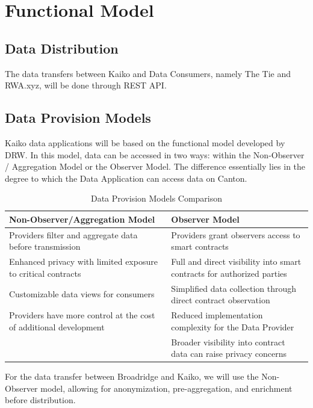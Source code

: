 \documentclass[11pt,a4paper]{article}
\begin{document}
\section{Functional Model}

\subsection{Data Distribution}

The data transfers between Kaiko and Data Consumers, namely The Tie and RWA.xyz, will be done through REST API.

\subsection{Data Provision Models}

Kaiko data applications will be based on the functional model developed by DRW. In this model, data can be accessed in two ways: within the Non-Observer / Aggregation Model or the Observer Model. The difference essentially lies in the degree to which the Data Application can access data on Canton.

\begin{table}[h!]
\centering
\caption{Data Provision Models Comparison}
\begin{tabular}{>{\raggedright\arraybackslash}p{} >{\raggedright\arraybackslash}p{}}
\toprule
\textbf{Non-Observer/Aggregation Model} & \textbf{Observer Model} \\
\midrule
Providers filter and aggregate data before transmission & Providers grant observers access to smart contracts \\
\addlinespace
Enhanced privacy with limited exposure to critical contracts & Full and direct visibility into smart contracts for authorized parties \\
\addlinespace
Customizable data views for consumers & Simplified data collection through direct contract observation \\
\addlinespace
Providers have more control at the cost of additional development & Reduced implementation complexity for the Data Provider \\
\addlinespace
& Broader visibility into contract data can raise privacy concerns \\
\bottomrule
\end{tabular}
\end{table}

For the data transfer between Broadridge and Kaiko, we will use the Non-Observer model, allowing for anonymization, pre-aggregation, and enrichment before distribution.
\end{document}
